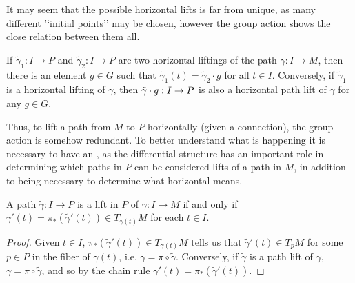 It may seem that the possible horizontal lifts is far from unique, as many different '`initial points'' may be chosen, however the group action shows the close relation between them all.

\begin{theorem}\label{thm:pathRed}
If $\tilde{\gamma}_1: I \to P$ and $\tilde{\gamma}_2: I \to P$ are two horizontal liftings of the path $\gamma:I \to M$, then there is an element $g \in G$ such that $\tilde{\gamma}_1 (t) = \tilde{\gamma}_2 \cdot g$ for all $t \in I$. Conversely, if $\tilde{\gamma}_1$ is a horizontal lifting of $\gamma$, then $\Tilde{\gamma}\cdot g :I \to P$ is also a horizontal path lift of $\gamma$ for any $g\in G$.
\end{theorem}

Thus, to lift a path from $M$ to $P$ horizontally (given a connection), the group action is somehow redundant. To better understand what is happening it is necessary to have an , as the differential structure has an important role in determining which paths in $P$ can be considered lifts of a path in $M$, in addition to being necessary to determine what horizontal means. 


\begin{proposition}
A path $\tilde{\gamma}:I \to P$ is a lift in $P$ of $\gamma:I \to M$ if and only if $\gamma'(t) = \pi_*(\tilde{\gamma}'(t)) \in T_{\gamma(t)}M$ for each $t \in I$.
\end{proposition}

\begin{proof}
Given $t \in I$, $\pi_*(\tilde{\gamma}'(t)) \in T_{\gamma(t)}M$ tells us that $\tilde{\gamma}'(t) \in T_p M$ for some $p \in P$ in the fiber of $\gamma(t)$, i.e. $\gamma = \pi \circ \tilde{\gamma}$. Conversely, if $\tilde{\gamma}$ is a path lift of $\gamma$, $\gamma = \pi \circ \tilde{\gamma}$, and so by the chain rule $\gamma'(t) = \pi_*(\tilde{\gamma}'(t))$.
\end{proof}

